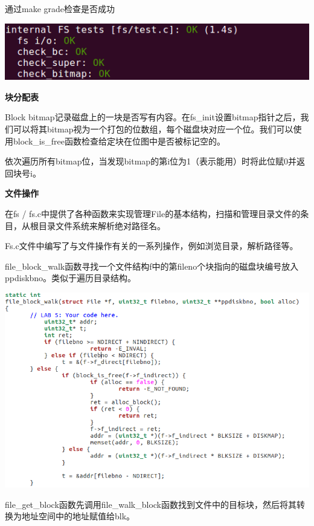 \begin{ExerciseList}
  通过make grade检查是否成功

  \includegraphics[width=6in]{figures/lab5/image72.png}

  \textbf{块分配表}

  Block bitmap记录磁盘上的一块是否写有内容。在fs\_init设置bitmap指针之后，我们可以将其bitmap视为一个打包的位数组，每个磁盘块对应一个位。我们可以使用block\_is\_free函数检查给定块在位图中是否被标记空的。


  依次遍历所有bitmap位，当发现bitmap的第i位为1（表示能用）时将此位赋0并返回块号i。

  \textbf{文件操作}

  在fs / fs.c中提供了各种函数来实现管理File的基本结构，扫描和管理目录文件的条目，从根目录文件系统来解析绝对路径名。


  Fs.c文件中编写了与文件操作有关的一系列操作，例如浏览目录，解析路径等。

  file\_block\_walk函数寻找一个文件结构f中的第fileno个块指向的磁盘块编号放入ppdiskbno。类似于遍历目录结构。

  \includegraphics[width=6in]{figures/lab5/image76.png}

  file\_get\_block函数先调用file\_walk\_block函数找到文件中的目标块，然后将其转换为地址空间中的地址赋值给blk。


\end{ExerciseList}
